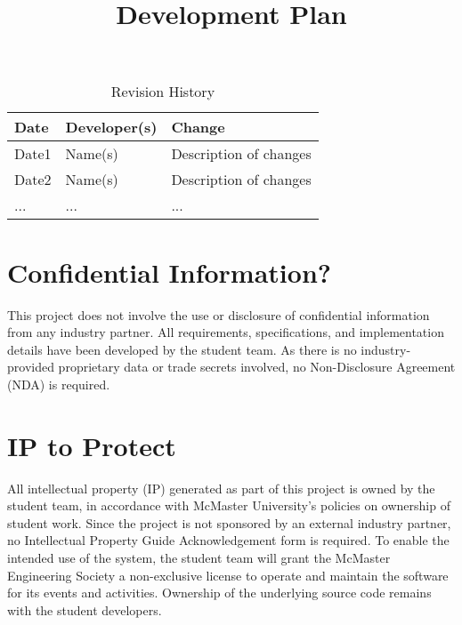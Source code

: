 \documentclass{article}
\title{Development Plan\\\progname}
\author{\authname}
\date{}
\begin{document}
\maketitle

\begin{table}[hp]
\caption{Revision History} \label{TblRevisionHistory}
\begin{tabularx}{\textwidth}{llX}
\toprule
\textbf{Date} & \textbf{Developer(s)} & \textbf{Change}\\
\midrule
Date1 & Name(s) & Description of changes\\
Date2 & Name(s) & Description of changes\\
... & ... & ...\\
\bottomrule
\end{tabularx}
\end{table}

\newpage{}



\section{Confidential Information?}

This project does not involve the use or disclosure of confidential information 
from any industry partner. All requirements, specifications, and implementation 
details have been developed by the student team. As there is no industry-provided proprietary data 
or trade secrets involved, no Non-Disclosure Agreement (NDA) is required. 

\section{IP to Protect}

All intellectual property (IP) generated as part of this project is owned by the 
student team, in accordance with McMaster University’s policies on ownership of 
student work. Since the project is not sponsored by an external industry partner, 
no Intellectual Property Guide Acknowledgement form is required. To enable the 
intended use of the system, the student team will grant the McMaster Engineering 
Society a non-exclusive license to operate and maintain the software for its 
events and activities. Ownership of the underlying source code remains with the 
student developers. 
\end{document}
